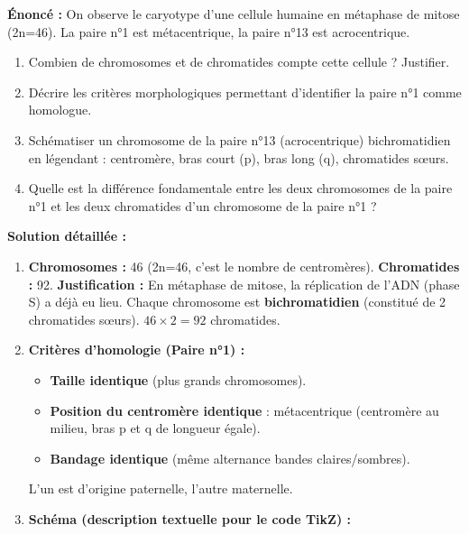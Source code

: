 \documentclass[11pt]{article}
\begin{document}
\begin{exoresolu}
\textbf{Énoncé :} On observe le caryotype d'une cellule humaine en métaphase de mitose (2n=46). La paire n°1 est métacentrique, la paire n°13 est acrocentrique.
\begin{enumerate}
    \item Combien de chromosomes et de chromatides compte cette cellule ? Justifier.
    \item Décrire les critères morphologiques permettant d'identifier la paire n°1 comme homologue.
    \item Schématiser un chromosome de la paire n°13 (acrocentrique) bichromatidien en légendant : centromère, bras court (p), bras long (q), chromatides sœurs.
    \item Quelle est la différence fondamentale entre les deux chromosomes de la paire n°1 et les deux chromatides d'un chromosome de la paire n°1 ?
\end{enumerate}
\tcblower
\textbf{Solution détaillée :}
\begin{enumerate}
    \item \textbf{Chromosomes :} 46 (2n=46, c'est le nombre de centromères). \textbf{Chromatides :} 92. \textbf{Justification :} En métaphase de mitose, la réplication de l'ADN (phase S) a déjà eu lieu. Chaque chromosome est \textbf{bichromatidien} (constitué de 2 chromatides sœurs). $46 \times 2 = 92$ chromatides.
    \item \textbf{Critères d'homologie (Paire n°1) :}
        \begin{itemize}
            \item \textbf{Taille identique} (plus grands chromosomes).
            \item \textbf{Position du centromère identique} : métacentrique (centromère au milieu, bras p et q de longueur égale).
            \item \textbf{Bandage identique} (même alternance bandes claires/sombres).
        \end{itemize}
        L'un est d'origine paternelle, l'autre maternelle.
    \item \textbf{Schéma (description textuelle pour le code TikZ) :}
        \begin{center}
\end{center}
\end{enumerate}
\end{exoresolu}
\end{document}
